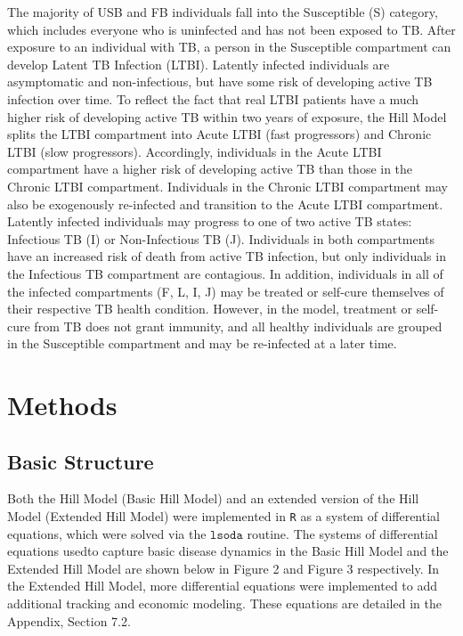 \documentclass{amsart}
\begin{document}
The majority of USB and FB individuals fall into the Susceptible (S) category,
which includes everyone who is uninfected and has not been exposed to TB.  After
exposure to an individual with TB, a person in the Susceptible compartment can
develop Latent TB Infection (LTBI). Latently infected individuals are
asymptomatic and non-infectious, but have some risk of developing active TB
infection over time. To reflect the fact that real LTBI patients have a
much higher risk of developing active TB within two years of exposure, the Hill
Model splits the LTBI compartment into Acute LTBI (fast progressors) and Chronic
LTBI (slow progressors). Accordingly, individuals in the Acute LTBI compartment
have a higher risk of developing active TB than those in the Chronic LTBI
compartment.  Individuals in the Chronic LTBI compartment may also be
exogenously re-infected and transition to the Acute LTBI compartment.  \\

Latently infected individuals may progress to one of two active TB states: Infectious TB (I) or 
Non-Infectious TB (J).  Individuals in both compartments have an increased risk of death from
active TB infection, but only individuals in the Infectious TB compartment are contagious.  
In addition, individuals in all of the infected compartments (F, L, I, J) may be treated or self-cure
themselves of their respective TB health condition.  However, in the model, treatment or self-cure from TB
does not grant immunity, and all healthy individuals are grouped in the Susceptible compartment
and may be re-infected at a later time.  \\

\section{Methods}
\subsection{Basic Structure}
Both the Hill Model (Basic Hill Model) and an extended version of the Hill Model (Extended Hill 
Model) were implemented in 
\texttt{R} as a system of differential equations, which were solved via the
$\texttt{lsoda}$ routine. The systems of differential equations usedto capture basic disease dynamics in the Basic Hill Model and the Extended Hill Model are
shown below in Figure 2 and Figure 3 respectively. In the Extended Hill Model,
more differential equations were implemented to add additional tracking and
economic modeling. These equations are detailed in the Appendix, Section 7.2. 
\end{document}
